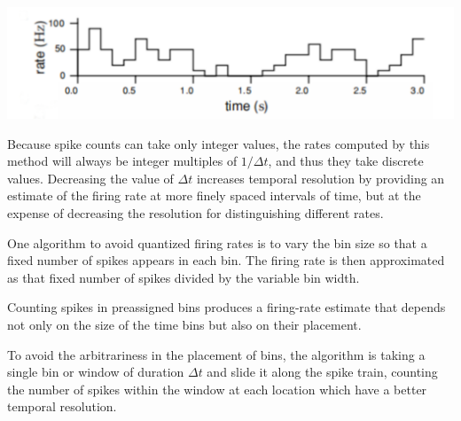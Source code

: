 \begin{center}
  \label{fig:1.4B}
  \includegraphics[scale=0.053]{./png/fig_1_4B.png}
\end{center}

\begin{lem}
   Because spike counts can take only integer values, the rates computed by this method will 
   always 
  be integer multiples of $1 / \Delta t$, and thus they take discrete values. Decreasing 
  the value of $\Delta t$
increases temporal resolution by providing an estimate of the firing rate at
more finely spaced intervals of time, but at the expense of decreasing the
resolution for distinguishing different rates.
\end{lem}

\begin{alg}
  One algorithm to avoid quantized
firing rates is to vary the bin size so that a fixed number of spikes appears
in each bin. The firing rate is then approximated as that fixed number of
spikes divided by the variable bin width.
\end{alg}

\begin{rem}
  Counting spikes in preassigned bins produces a firing-rate estimate that
depends not only on the size of the time bins but also on their placement.
\end{rem}

\begin{alg}
To avoid the arbitrariness in the placement of bins, the algorithm is taking
a single bin or window of duration $\Delta t$ and slide it along the spike train,
counting the number of spikes within the window at each location which have a better 
temporal resolution.
\end{alg}

